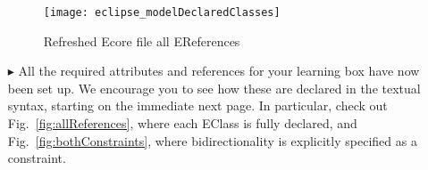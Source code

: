 \begin{itemize}
\vspace{1cm}

\begin{figure}[htbp]
	\centering
  \texttt{[image: eclipse\_modelDeclaredClasses]}
	\caption{Refreshed Ecore file all EReferences}
	\label{fig:model_allClasses}
\end{figure}

\vspace{1cm}

\item[$\blacktriangleright$] All the required attributes and references for your learning box have now been set up. We encourage you to see how these are
declared in the textual syntax, starting on the immediate next page. In particular, check out Fig.~\ref{fig:allReferences}, where each EClass is fully
declared, and Fig.~\ref{fig:bothConstraints}, where bidirectionality is explicitly specified as a constraint.


\end{itemize}
